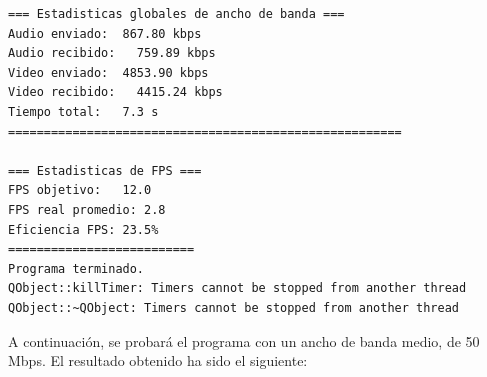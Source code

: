 \begin{adjustbox}{max width=\textwidth}
\begin{lstlisting}[language=bash,basicstyle=\ttfamily\scriptsize]
=== Estadisticas globales de ancho de banda ===
Audio enviado:	867.80 kbps
Audio recibido:   759.89 kbps
Video enviado:	4853.90 kbps
Video recibido:   4415.24 kbps
Tiempo total: 	7.3 s
=======================================================

=== Estadisticas de FPS ===
FPS objetivo: 	12.0
FPS real promedio: 2.8
Eficiencia FPS:	23.5%
==========================
Programa terminado.
QObject::killTimer: Timers cannot be stopped from another thread
QObject::~QObject: Timers cannot be stopped from another thread
\end{lstlisting}
\end{adjustbox}
\vspace{\baselineskip}

\newpage

A continuación, se probará el programa con un ancho de banda medio, de 50 Mbps. El resultado obtenido ha sido el siguiente:
\vspace{\baselineskip}

